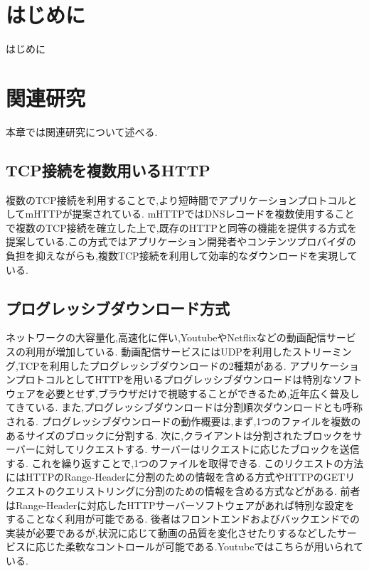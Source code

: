 \documentclass[a4j,12pt]{gradthesis_utf8}
\begin{document}
 
\maketitle %

\chapter{はじめに}\label{sec:sec1}
はじめに
\chapter{関連研究}\label{sec:sec2}
本章では関連研究について述べる.

\section{TCP接続を複数用いるHTTP}
複数のTCP接続を利用することで,より短時間でアプリケーションプロトコルとしてmHTTP\cite{mhttp}が提案されている.
mHTTPではDNSレコードを複数使用することで複数のTCP接続を確立した上で,既存のHTTPと同等の機能を提供する方式を提案している.この方式ではアプリケーション開発者やコンテンツプロバイダの負担を抑えながらも,複数TCP接続を利用して効率的なダウンロードを実現している.

\newpage

\section{プログレッシブダウンロード方式}
ネットワークの大容量化,高速化に伴い,Youtube\cite{youtube}やNetflix\cite{netflix}などの動画配信サービスの利用が増加している.
動画配信サービスにはUDPを利用したストリーミング,TCPを利用したプログレッシブダウンロードの2種類がある.
アプリケーションプロトコルとしてHTTPを用いるプログレッシブダウンロードは特別なソフトウェアを必要とせず,ブラウザだけで視聴することができるため,近年広く普及してきている.
また,プログレッシブダウンロードは分割順次ダウンロードとも呼称される.
プログレッシブダウンロードの動作概要は,まず,1つのファイルを複数のあるサイズのブロックに分割する.
次に,クライアントは分割されたブロックをサーバーに対してリクエストする.
サーバーはリクエストに応じたブロックを送信する.
これを繰り返すことで,1つのファイルを取得できる.
このリクエストの方法にはHTTPのRange-Headerに分割のための情報を含める方式やHTTPのGETリクエストのクエリストリングに分割のための情報を含める方式などがある.
前者はRange-Headerに対応したHTTPサーバーソフトウェアがあれば特別な設定をすることなく利用が可能である.
後者はフロントエンドおよびバックエンドでの実装が必要であるが,状況に応じて動画の品質を変化させたりするなどしたサービスに応じた柔軟なコントロールが可能である.Youtubeではこちらが用いられている.
\end{document}
